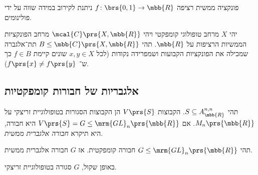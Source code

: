 \documentclass[10pt, twoside]{book}
\begin{document}
\begin{theorem}
פונקציה ממשית רציפה
$f \colon \brs{0,1} \to \mbb{R}$
ניתנת לקירוב במידה שווה על ידי פולינומים.
\end{theorem}

\begin{theorem}
יהי
$X$
מרחב טופולוגי קומפקטי ויהי
$\mcal{C}\prs{X,\mbb{R}}$
מרחב הפונקציות הממשיות הרציפות על
$\mbb{R}$.
תהי
$B \leq \mbb{C}\prs{X,\mbb{R}}$
תת־אלגברה שמכילה את הפונקציות הקבועות ושמפרידה נקודות (לכל $x,y \in X$ שונים קיימת $f \in B$ כך ש־%
$f\prs{x} \neq f\prs{y}$).
\end{theorem}


\subsection{אלגבריות של חבורות קומפקטיות}

\begin{definition}
תהי
$S \subseteq A_{\mbb{R}}^{n, n}$.
הקבוצות
$V\prs{S}$
הן הקבוצות הסגורות בטופולוגיית זריצקי על
$M_n\prs{\mbb{R}}$.
אם
$V\prs{S} = G \leq \mrm{GL}_n\prs{\mbb{R}}$
היא חבורה, היא תיקרא
\emph{חבורה אלגברית ממשית}.
\end{definition}

\begin{theorem}
תהי
$G \leq \mrm{GL}_n\prs{\mbb{R}}$
חבורה קומפקטית. אז
$G$
חבורה אלגברית ממשית.

באופן שקול,
$G$
סגורה בטופולוגיית זריצקי.
\end{theorem}
\end{document}
